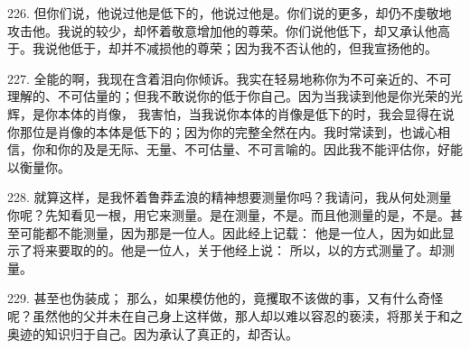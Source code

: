 226. 但你们说，他说过他是低下的，他说过他是。你们说的更多，却仍不虔敬地攻击他。我说的较少，却怀着敬意增加他的尊荣。你们说他低下，却又承认他高于。我说他低于，却并不减损他的尊荣；因为我不否认他的，但我宣扬他的。\par

\par

227. 全能的啊，我现在含着泪向你倾诉。我实在轻易地称你为不可亲近的、不可理解的、不可估量的；但我不敢说你的低于你自己。因为当我读到他是你光荣的光辉，是你本体的肖像， 我害怕，当我说你本体的肖像是低下的时，我会显得在说你那位是肖像的本体是低下的；因为你的完整全然在内。我时常读到，也诚心相信，你和你的及是无际、无量、不可估量、不可言喻的。因此我不能评估你，好能以衡量你。\par

228. 就算这样，是我怀着鲁莽孟浪的精神想要测量你吗？我请问，我从何处测量你呢？先知看见一根，用它来测量。是在测量，不是。而且他测量的是，不是。甚至可能都不能测量，因为那是一位人。因此经上记载：  他是一位人，因为如此显示了将来要取的的。他是一位人，关于他经上说：  所以，以的方式测量了。却测量。\par

229. 甚至也伪装成； 那么，如果模仿他的，竟攫取不该做的事，又有什么奇怪呢？虽然他的父并未在自己身上这样做，那人却以难以容忍的亵渎，将那关于和之奥迹的知识归于自己。因为承认了真正的，却否认。\par

